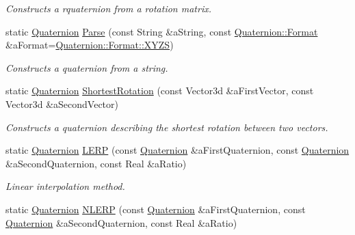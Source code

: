 \begin{DoxyCompactItemize}
\begin{DoxyCompactList}\small\item\em Constructs a rquaternion from a rotation matrix. \end{DoxyCompactList}\item 
static \hyperlink{classostk_1_1math_1_1geom_1_1d3_1_1trf_1_1rot_1_1_quaternion}{Quaternion} \hyperlink{classostk_1_1math_1_1geom_1_1d3_1_1trf_1_1rot_1_1_quaternion_a43e3a5770d4543534712cea86fb0202b}{Parse} (const String \&a\+String, const \hyperlink{classostk_1_1math_1_1geom_1_1d3_1_1trf_1_1rot_1_1_quaternion_aa7a75f0dd505a58236ee355959e00bfd}{Quaternion\+::\+Format} \&a\+Format=\hyperlink{classostk_1_1math_1_1geom_1_1d3_1_1trf_1_1rot_1_1_quaternion_aa7a75f0dd505a58236ee355959e00bfda11c51ecd5dc6f86ba3c1ae79e21482f5}{Quaternion\+::\+Format\+::\+X\+Y\+ZS})
\begin{DoxyCompactList}\small\item\em Constructs a quaternion from a string. \end{DoxyCompactList}\item 
static \hyperlink{classostk_1_1math_1_1geom_1_1d3_1_1trf_1_1rot_1_1_quaternion}{Quaternion} \hyperlink{classostk_1_1math_1_1geom_1_1d3_1_1trf_1_1rot_1_1_quaternion_a577ce79f1b77303355a96fc6e4f71310}{Shortest\+Rotation} (const Vector3d \&a\+First\+Vector, const Vector3d \&a\+Second\+Vector)
\begin{DoxyCompactList}\small\item\em Constructs a quaternion describing the shortest rotation between two vectors. \end{DoxyCompactList}\item 
static \hyperlink{classostk_1_1math_1_1geom_1_1d3_1_1trf_1_1rot_1_1_quaternion}{Quaternion} \hyperlink{classostk_1_1math_1_1geom_1_1d3_1_1trf_1_1rot_1_1_quaternion_afdce957b3873db3f458a479db3b1cfd4}{L\+E\+RP} (const \hyperlink{classostk_1_1math_1_1geom_1_1d3_1_1trf_1_1rot_1_1_quaternion}{Quaternion} \&a\+First\+Quaternion, const \hyperlink{classostk_1_1math_1_1geom_1_1d3_1_1trf_1_1rot_1_1_quaternion}{Quaternion} \&a\+Second\+Quaternion, const Real \&a\+Ratio)
\begin{DoxyCompactList}\small\item\em Linear interpolation method. \end{DoxyCompactList}\item 
static \hyperlink{classostk_1_1math_1_1geom_1_1d3_1_1trf_1_1rot_1_1_quaternion}{Quaternion} \hyperlink{classostk_1_1math_1_1geom_1_1d3_1_1trf_1_1rot_1_1_quaternion_a0dc52e246578fc512b9918339d8ba6b9}{N\+L\+E\+RP} (const \hyperlink{classostk_1_1math_1_1geom_1_1d3_1_1trf_1_1rot_1_1_quaternion}{Quaternion} \&a\+First\+Quaternion, const \hyperlink{classostk_1_1math_1_1geom_1_1d3_1_1trf_1_1rot_1_1_quaternion}{Quaternion} \&a\+Second\+Quaternion, const Real \&a\+Ratio)

\end{DoxyCompactItemize}
